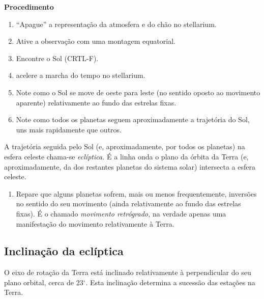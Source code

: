 \documentclass{article}
\begin{document}
\textbf{Procedimento}
\begin{enumerate}
  \item ``Apague'' a representação da atmosfera e do chão no stellarium.
  \item Ative a observação com uma montagem equatorial.
  \item Encontre o Sol (CRTL-F).
  \item acelere a marcha do tempo no stellarium.
  \item Note como o Sol se move de oeste para leste (no sentido oposto ao
    movimento aparente) relativamente ao fundo das estrelas fixas.
  \item Note como todos os planetas seguem aproximadamente a trajetória do Sol,
    uns mais rapidamente que outros.
\end{enumerate}
A trajetória seguida pelo Sol (e, aproximadamente, por todos os planetas) na
esfera celeste chama-se \emph{eclíptica.} É a linha onda o plano da órbita da
Terra (e, aproximadamente, da dos restantes planetas do sistema solar)
intersecta a esfera celeste.
\begin{enumerate}[resume]
  \item Repare que alguns planetas sofrem, mais ou menos frequentemente,
    inversões no sentido do seu movimento (ainda relativamente ao fundo das
    estrelas fixas). É o chamado \emph{movimento retrógrado,} na verdade apenas
    uma manifestação do movimento relativamente à Terra.
\end{enumerate}

\subsection{Inclinação da eclíptica}
O eixo de rotação da Terra está inclinado relativamente à perpendicular do seu
plano orbital, cerca de 23$^\circ$. Esta inclinação determina a sucessão das
estações na Terra. 
\end{document}

